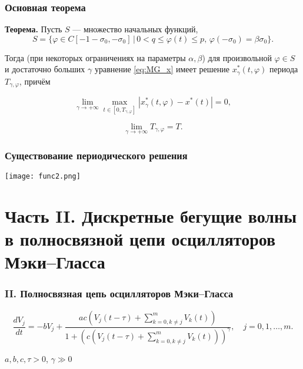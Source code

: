 \begin{frame}
	\frametitle{Основная теорема}
	\textbf{Теорема.} Пусть $S$ --- множество начальных функций,
	\[
	S = \{\varphi \in C[-1 - \sigma_0, -\sigma_0] \, | \, 0 < q \leq \varphi(t) \leq p, \, \varphi(-\sigma_0) = \beta \sigma_0\}.
	\]
	
	Тогда (при некоторых ограничениях на параметры $\alpha, \beta$) для произвольной $\varphi \in S$ и достаточно больших $\gamma$ уравнение \eqref{eq:MG_x} имеет решение $x^*_\gamma(t, \varphi)$ периода $T_{\gamma, \varphi}$, причём
	
	\[
	\lim\limits_{\gamma \to +\infty} \max\limits_{t \in [0, T_{\gamma, \varphi}]} |x^*_\gamma(t, \varphi) - x^*(t)| = 0,
	\]
	
	\[
	\lim\limits_{\gamma \to +\infty} T_{\gamma, \varphi} = T.
	\]
\end{frame}
%
%	

\begin{frame}
	\frametitle{Существование периодического решения}
	
	\begin{center}
		\texttt{[image: func2.png]}
	\end{center}
\end{frame}

\section{Часть II. Дискретные бегущие волны в полносвязной цепи осцилляторов Мэки--Гласса}


\begin{frame}
	\frametitle{II. Полносвязная цепь осцилляторов Мэки--Гласса}
	
	\begin{equation*}
		\label{eq:system_full_generators}
		\dfrac{d V_{j}}{dt}=- bV_{j} + \dfrac{ac\left(V_{j}(t - \tau) + \sum\limits_{k = 0, k\neq j}^{m}V_{k}(t)\right)}{1 + \left(c\left(V_{j}(t - \tau) + \sum\limits_{k = 0, k\neq j}^{m}V_{k}(t)\right)\right)^{\gamma}}, \quad j=0,1,\ldots,m.
	\end{equation*}
	
	$a, b, c, \tau > 0$, $\gamma \gg 0$
\end{frame}

